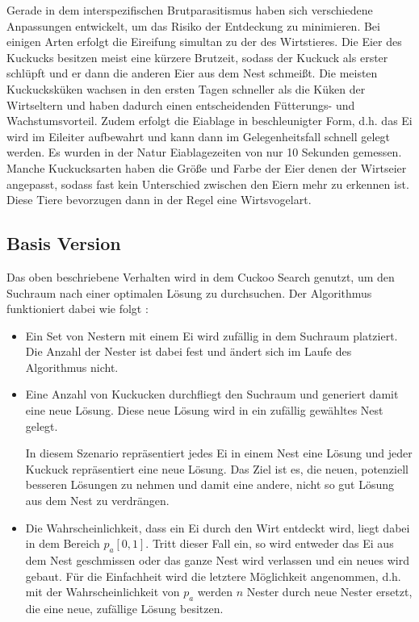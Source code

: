 \documentclass[conference]{IEEEtran}
\begin{document}
      Gerade in dem interspezifischen Brutparasitismus haben sich verschiedene Anpassungen entwickelt, 
      um das Risiko der Entdeckung zu minimieren. Bei einigen Arten erfolgt die Eireifung simultan zu 
      der des Wirtstieres. Die Eier des Kuckucks besitzen meist eine kürzere Brutzeit, sodass der Kuckuck 
      als erster schlüpft und er dann die anderen Eier aus dem Nest schmeißt. Die meisten Kuckucksküken 
      wachsen in den ersten Tagen schneller als die Küken der Wirtseltern und haben dadurch einen entscheidenden 
      Fütterungs- und Wachstumsvorteil.  Zudem erfolgt die Eiablage in beschleunigter Form, d.h. das Ei 
      wird im Eileiter aufbewahrt und kann dann im Gelegenheitsfall schnell gelegt werden. Es wurden in der Natur 
      Eiablagezeiten von nur 10 Sekunden gemessen. Manche Kuckucksarten haben die Größe und Farbe der Eier denen 
      der Wirtseier angepasst, sodass fast kein Unterschied zwischen den Eiern mehr zu erkennen ist. Diese Tiere 
      bevorzugen dann in der Regel eine Wirtsvogelart.     


    \subsection{Basis Version}
      Das oben beschriebene Verhalten wird in dem Cuckoo Search genutzt, um den Suchraum nach einer optimalen Lösung 
      zu durchsuchen. Der Algorithmus funktioniert dabei wie folgt \cite{b1}:

      \begin{itemize}
        \item Ein Set von Nestern mit einem Ei wird zufällig in dem Suchraum platziert. Die Anzahl der Nester 
          ist dabei fest und ändert sich im Laufe des Algorithmus nicht. 

        \item Eine Anzahl von Kuckucken durchfliegt den Suchraum und generiert damit eine neue Lösung. Diese 
          neue Lösung wird in ein zufällig gewähltes Nest gelegt. 

          In diesem Szenario repräsentiert jedes Ei in einem Nest eine Lösung und jeder Kuckuck repräsentiert eine 
          neue Lösung. Das Ziel ist es, die neuen, potenziell besseren Lösungen zu nehmen und damit eine andere, 
          nicht so gut Lösung aus dem Nest zu verdrängen. 

        \item Die Wahrscheinlichkeit, dass ein Ei durch den Wirt entdeckt wird, liegt dabei in dem Bereich $p_{a}[0,1]$. 
          Tritt dieser Fall ein, so wird entweder das Ei aus dem Nest geschmissen oder das ganze Nest wird verlassen 
          und ein neues wird gebaut. Für die Einfachheit wird die letztere Möglichkeit angenommen, d.h. mit 
          der Wahrscheinlichkeit von $p_{a}$ werden $n$ Nester durch neue Nester ersetzt, die eine neue, zufällige Lösung besitzen. 
      \end{itemize}
\end{document}
